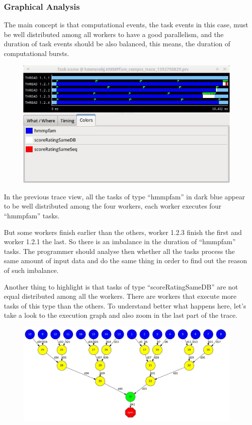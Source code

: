 \subsubsection{Graphical Analysis}

The main concept is that computational events, the task events in this case, must be well distributed among all workers to have a good parallelism, and the duration of task events should be also balanced, this means, the duration of computational bursts.

\begin{figure}[ht!]
  \centering
    \includegraphics[width=1.0\textwidth]{./Sections/7_Tracing/Figures/8.jpeg}
\end{figure}

In the previous trace view, all the tasks of type “hmmpfam” in dark blue appear to be well distributed among the four workers, each worker executes four “hmmpfam” tasks.

But some workers finish earlier than the others, worker 1.2.3 finish the first and worker 1.2.1 the last. So there is an imbalance in the duration of “hmmpfam” tasks. The programmer should analyse then whether all the tasks process the same amount of input data and do the same thing in order to find out the reason of such imbalance.

Another thing to highlight is that tasks of type “scoreRatingSameDB” are not equal distributed among all the workers. There are workers that execute more tasks of this type than the others. To understand better what happens here, let’s take a look to the execution graph and also zoom in the last part of the trace.

\begin{figure}[ht!]
  \centering
    \includegraphics[width=1.0\textwidth]{./Sections/7_Tracing/Figures/9.jpeg}
\end{figure}

